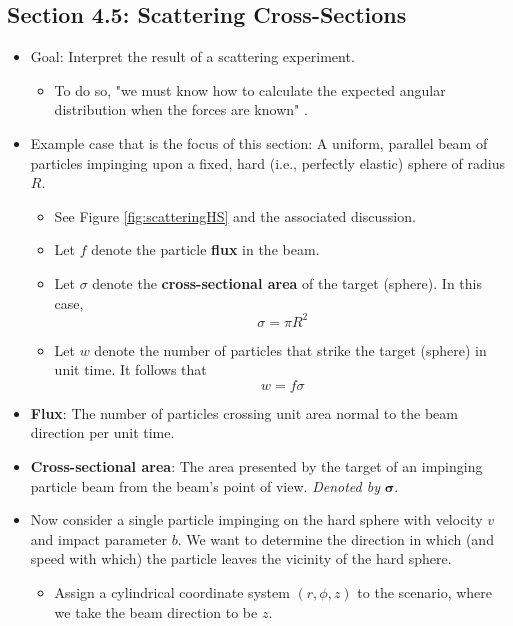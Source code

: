 \documentclass[../notes.tex]{subfiles}
\begin{document}
\subsection*{Section 4.5: Scattering Cross-Sections}
\begin{itemize}
    \item Goal: Interpret the result of a scattering experiment.
    \begin{itemize}
        \item To do so, "we must know how to calculate the expected angular distribution when the forces are known" \parencite[90]{bib:KibbleBerkshire}.
    \end{itemize}
    \item Example case that is the focus of this section: A uniform, parallel beam of particles impinging upon a fixed, hard (i.e., perfectly elastic) sphere of radius $R$.
    \begin{itemize}
        \item See Figure \ref{fig:scatteringHS} and the associated discussion.
        \item Let $f$ denote the particle \textbf{flux} in the beam.
        \item Let $\sigma$ denote the \textbf{cross-sectional area} of the target (sphere). In this case,
        \begin{equation*}
            \sigma = \pi R^2
        \end{equation*}
        \item Let $w$ denote the number of particles that strike the target (sphere) in unit time. It follows that
        \begin{equation*}
            w = f\sigma
        \end{equation*}
    \end{itemize}
    \item \textbf{Flux}: The number of particles crossing unit area normal to the beam direction per unit time.
    \item \textbf{Cross-sectional area}: The area presented by the target of an impinging particle beam from the beam's point of view. \emph{Denoted by} $\bm{\sigma}$.
    \item Now consider a single particle impinging on the hard sphere with velocity $v$ and impact parameter $b$. We want to determine the direction in which (and speed with which) the particle leaves the vicinity of the hard sphere.
    \begin{itemize}
        \item Assign a cylindrical coordinate system $(r,\phi,z)$ to the scenario, where we take the beam direction to be $z$.

\end{itemize}
\end{itemize}
\end{document}
